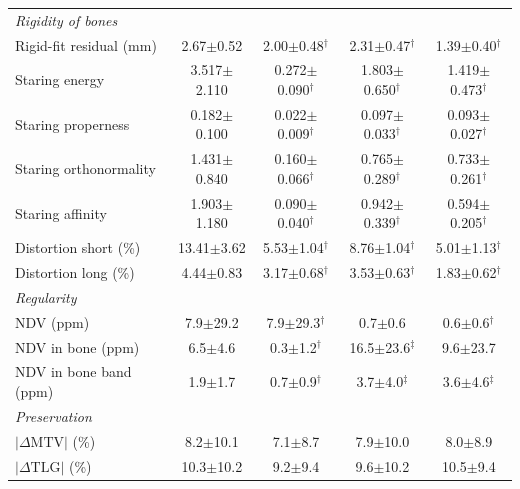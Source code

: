 \begin{table}[t]
{\begin{tabular}{lcccc}
\multicolumn{5}{l}{\textit{Rigidity of bones}} \\
Rigid-fit residual (mm) & 2.67$\pm$0.52 & 2.00$\pm$0.48$^{\dagger}$ & 2.31$\pm$0.47$^{\dagger}$ & 1.39$\pm$0.40$^{\dagger}$ \\
Staring energy & 3.517$\pm$2.110 & 0.272$\pm$0.090$^{\dagger}$ & 1.803$\pm$0.650$^{\dagger}$ & 1.419$\pm$0.473$^{\dagger}$ \\
Staring properness & 0.182$\pm$0.100 & 0.022$\pm$0.009$^{\dagger}$ & 0.097$\pm$0.033$^{\dagger}$ & 0.093$\pm$0.027$^{\dagger}$ \\
Staring orthonormality & 1.431$\pm$0.840 & 0.160$\pm$0.066$^{\dagger}$ & 0.765$\pm$0.289$^{\dagger}$ & 0.733$\pm$0.261$^{\dagger}$ \\
Staring affinity & 1.903$\pm$1.180 & 0.090$\pm$0.040$^{\dagger}$ & 0.942$\pm$0.339$^{\dagger}$ & 0.594$\pm$0.205$^{\dagger}$ \\
Distortion short (\%) & 13.41$\pm$3.62 & 5.53$\pm$1.04$^{\dagger}$ & 8.76$\pm$1.04$^{\dagger}$ & 5.01$\pm$1.13$^{\dagger}$ \\
Distortion long (\%) & 4.44$\pm$0.83 & 3.17$\pm$0.68$^{\dagger}$ & 3.53$\pm$0.63$^{\dagger}$ & 1.83$\pm$0.62$^{\dagger}$ \\
\multicolumn{5}{l}{\textit{Regularity}} \\
NDV (ppm) & 7.9$\pm$29.2 & 7.9$\pm$29.3$^{\dagger}$ & 0.7$\pm$0.6 & 0.6$\pm$0.6$^{\dagger}$ \\
NDV in bone (ppm) & 6.5$\pm$4.6 & 0.3$\pm$1.2$^{\dagger}$ & 16.5$\pm$23.6$^{\ddagger}$ & 9.6$\pm$23.7 \\
NDV in bone band (ppm) & 1.9$\pm$1.7 & 0.7$\pm$0.9$^{\dagger}$ & 3.7$\pm$4.0$^{\ddagger}$ & 3.6$\pm$4.6$^{\ddagger}$ \\
\multicolumn{5}{l}{\textit{Preservation}} \\
$|\Delta\mathrm{MTV}|$ (\%) & 8.2$\pm$10.1 & 7.1$\pm$8.7 & 7.9$\pm$10.0 & 8.0$\pm$8.9 \\
$|\Delta\mathrm{TLG}|$ (\%) & 10.3$\pm$10.2 & 9.2$\pm$9.4 & 9.6$\pm$10.2 & 10.5$\pm$9.4 \\
\bottomrule
\end{tabular}}
\end{table}

